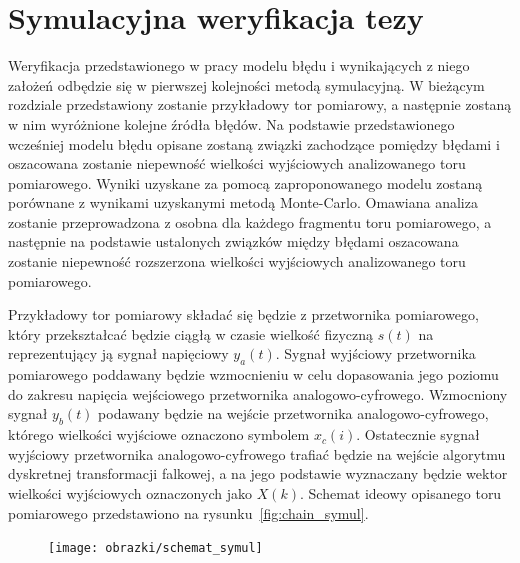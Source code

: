 \chapter{Symulacyjna weryfikacja tezy}

Weryfikacja przedstawionego w pracy modelu błędu i wynikających z niego założeń odbędzie się w pierwszej kolejności metodą symulacyjną. W bieżącym rozdziale przedstawiony zostanie przykładowy tor pomiarowy, a następnie zostaną w nim wyróżnione kolejne źródła błędów. Na podstawie przedstawionego wcześniej modelu błędu opisane zostaną związki zachodzące pomiędzy błędami i oszacowana zostanie niepewność wielkości wyjściowych analizowanego toru pomiarowego. Wyniki uzyskane za pomocą zaproponowanego modelu zostaną porównane z wynikami uzyskanymi metodą Monte-Carlo. Omawiana analiza zostanie przeprowadzona z osobna dla każdego fragmentu toru pomiarowego, a następnie na podstawie ustalonych związków między błędami oszacowana zostanie niepewność rozszerzona wielkości wyjściowych analizowanego toru pomiarowego.

Przykładowy tor pomiarowy składać się będzie z przetwornika pomiarowego, który przekształcać będzie ciągłą w czasie wielkość fizyczną $s(t)$ na reprezentujący ją sygnał napięciowy $y_{a}(t)$. Sygnał wyjściowy przetwornika pomiarowego poddawany będzie wzmocnieniu w celu dopasowania jego poziomu do zakresu napięcia wejściowego przetwornika analogowo-cyfrowego. Wzmocniony sygnał $y_{b}(t)$ podawany będzie na wejście przetwornika analogowo-cyfrowego, którego wielkości wyjściowe oznaczono symbolem $x_{c}(i)$. Ostatecznie sygnał wyjściowy przetwornika analogowo-cyfrowego trafiać będzie na wejście algorytmu dyskretnej transformacji falkowej, a na jego podstawie wyznaczany będzie wektor wielkości wyjściowych oznaczonych jako $X(k)$. Schemat ideowy opisanego toru pomiarowego przedstawiono na rysunku~\ref{fig:chain_symul}.

\begin{figure}[htb!]
\begin{center}
\texttt{[image: obrazki/schemat\_symul]}
\end{center}
\end{figure}

